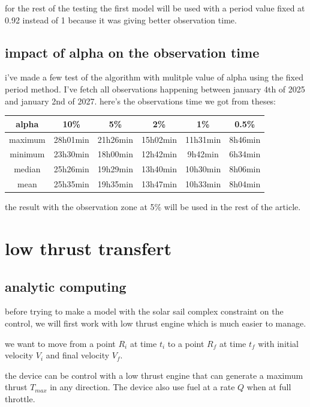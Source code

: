 \documentclass[11pt]{article} %
\begin{document}
		for the rest of the testing the first model will be used with a period value fixed at 0.92 instead of 1 because it was giving better observation time.
		
		\subsection{impact of alpha on the observation time}
		
		i've made a few test of the algorithm with mulitple value of alpha using the fixed period method. I've fetch all observations happening between january 4th of 2025 and january 2nd of 2027. here's the observations time we got from theses:  
		\begin{center}
			\begin{tabular}{||c||c c c c c||} 
				\hline
				alpha & 10\% & 5\% & 2\% &1\% & 0.5\% \\ [0.5ex] 
				\hline\hline
				maximum & 28h01min & 21h26min & 15h02min &11h31min & 8h46min \\ 
				\hline
				minimum & 23h30min & 18h00min & 12h42min &9h42min& 6h34min \\
				\hline
				median & 25h26min & 19h29min & 13h40min &10h30min& 8h06min\\
				\hline
				mean & 25h35min & 19h35min & 13h47min &10h33min& 8h04min\\ 
				\hline
			\end{tabular}
		\end{center}
		
		the result with the observation zone at 5\% will be used in the rest of the article.
		
		\section{low thrust transfert}
			
			\subsection{analytic computing}
			
			before trying to make a model with the solar sail complex constraint on the control, we will first work with low thrust engine which is much easier to manage.
			
			we want to move from a point $R_i$ at time $t_i$ to a point $R_f$ at time $t_f$ with initial velocity $V_i$ and final velocity $V_f$.
			
			the device can be control with a low thrust engine that can generate a maximum thrust $T_{max}$ in any direction. The device also use fuel at a rate $Q$ when at full throttle.
			
\end{document}
